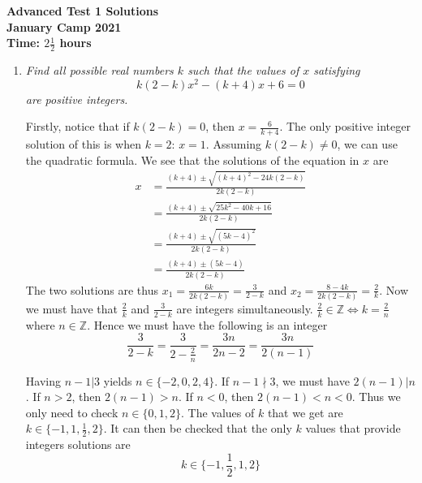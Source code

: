 \documentclass{article}
\begin{document}
\thispagestyle{empty}

\begin{center}
  \textbf{\Large Advanced Test 1 Solutions}
  \\ \vspace{1em}
  \textbf{\large January Camp 2021}
  \\ \vspace{1em}
  \textbf{\large Time: $2\frac{1}{2}$ hours}
\end{center}

\vspace{24pt}

\begin{enumerate}[1.]

\item %
{\itshape Find all possible real numbers $k$ such that the values of $x$ satisfying
$$k(2 - k)x^2 - (k + 4)x + 6 = 0$$
are positive integers.}

Firstly, notice that if $k(2 - k) = 0$, then $x = \frac{6}{k + 4}$. The only positive integer solution of this is when $k = 2$: $x = 1$.
Assuming $k(2 - k) \ne 0$, we can use the quadratic formula. We see that the solutions of the equation in $x$ are
\begin{align*}
    x &= \frac{(k + 4) \pm \sqrt{(k + 4)^2 - 24k(2 - k)}}{2k(2 - k)} \\
    &= \frac{(k + 4) \pm \sqrt{25k^2 - 40k + 16}}{2k(2 - k)} \\
    &= \frac{(k + 4) \pm \sqrt{(5k - 4)^2}}{2k(2 - k)} \\
    &= \frac{(k + 4) \pm (5k - 4)}{2k(2 - k)}
\end{align*}
The two solutions are thus $x_1 = \frac{6k}{2k(2 - k)} = \frac{3}{2 - k}$ and $x_2 = \frac{8 - 4k}{2k(2 - k)} = \frac{2}{k}$. Now we must have that $\frac{2}{k}$ and $\frac{3}{2 - k}$ are integers simultaneously. $\frac{2}{k} \in \mathbb{Z} \iff k = \frac{2}{n}$ where $n \in \mathbb{Z}$. Hence we must have the following is an integer 
$$\frac{3}{2 - k} = \frac{3}{2 - \frac{2}{n}} = \frac{3n}{2n - 2}= \frac{3n}{2(n - 1)}$$

Having $n - 1 | 3$ yields $n \in \{-2, 0, 2, 4\}$. If $n - 1 \nmid 3$, we must have $2(n - 1) | n$. If $n > 2$, then $2(n - 1) > n$. If $n < 0$, then $2(n - 1) < n < 0$. Thus we only need to check $n \in \{0, 1, 2\}$. The values of $k$ that we get are $k \in \{-1, 1, \frac{1}{2}, 2\}$. It can then be checked that the only $k$ values that provide integers solutions are 
$$k \in \{-1, \frac{1}{2}, 1, 2\}$$


\end{enumerate}
\end{document}
